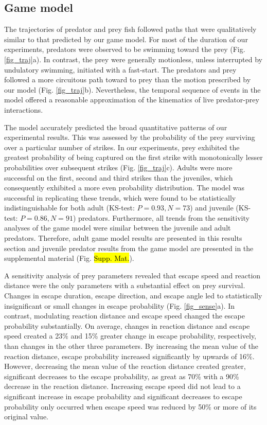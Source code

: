 \documentclass[]{rsos}%
\begin{document}
\subsection{Game model} %
The trajectories of predator and prey fish followed paths that were qualitatively similar to that predicted by our game model.
For most of the duration of our experiments, predators were observed to be swimming toward the prey (Fig. \ref{fig_traj}a). 
In contrast, the prey were generally motionless, unless interrupted by undulatory swimming, initiated with a fast-start.
The predators and prey followed a more circuitous path toward to prey than the motion prescribed by our model (Fig. \ref{fig_traj}b).
Nevertheless, the temporal sequence of events in the model offered a reasonable approximation of the kinematics of live predator-prey interactions.

The model accurately predicted the broad quantitative patterns of our experimental results.
This was assessed by the probability of the prey surviving over a particular number of strikes. 
In our experiments, prey exhibited the greatest probability of being captured on the first strike with monotonically lesser probabilities over subsequent strikes (Fig. \ref{fig_traj}c).
Adults were more successful on the first, second and third strikes than the juveniles, which consequently exhibited a more even probability distribution.
The model was successful in replicating these trends, which were found to be statistically indistinguishable for both adult (KS-test: $P = 0.93, N = 73$) and juvenile (KS-test: $P = 0.86, N = 91$) predators. 
Furthermore, all trends from the sensitivity analyses of the game model were similar between the juvenile and adult predators. 
Therefore, adult game model results are presented in this results section and juvenile predator results from the game model are presented in the supplemental material (Fig. \hl{Supp. Mat.}).


A sensitivity analysis of prey parameters revealed that escape speed and reaction distance were the only parameters with a substantial effect on prey survival. 
Changes in escape duration, escape direction, and escape angle led to statistically insignificant or small changes in escape probability (Fig. \ref{fig_sense}a). 
In contrast, modulating reaction distance and escape speed changed the escape probability substantially.
On average, changes in reaction distance and escape speed created a 23\% and 15\% greater change in escape probability, respectively, than changes in the other three parameters.
By increasing the mean value of the reaction distance, escape probability increased significantly by upwards of 16\%. 
However, decreasing the mean value of the reaction distance created greater, significant decreases to the escape probability, as great as 70\% with a 90\% decrease in the reaction distance. 
Increasing escape speed did not lead to a significant increase in escape probability and significant decreases to escape probability only occurred when escape speed was reduced by 50\% or more of its original value.
\end{document}
